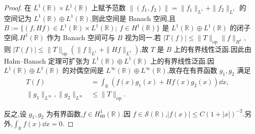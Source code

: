 \begin{proof}
在 $L^{1}(\mathbb{R}) \times L^{1}(\mathbb{R})$ 上赋予范数 $\| (f_{1}, f_{2}) \| = \| f_{1} \|_{L^{1}} + \| f_{2} \|_{L^{1}}$ 的空间记为 $L^{1}(\mathbb{R}) \oplus L^{1}(\mathbb{R})$,则此空间是 Banach 空间,且 $B := \{(f, Hf) \in L^{1}(\mathbb{R}) \times L^{1}(\mathbb{R});\ f \in H^{1}(\mathbb{R})\}$ 是 $L^{1}(\mathbb{R}) \oplus L^{1}(\mathbb{R})$ 的闭子空间.$H^{1}(\mathbb{R})$ 作为 Banach 空间可与 $B$ 视为同一.若 $|T(f)| \leq \| T \|_{\mathrm{op}}\| f \|_{H^{1}}$,则 $|T(f)| \leq \| T \|_{\mathrm{op}}\left(\| f \|_{L^{1}} + \| Hf \|_{L^{1}}\right)$,故 $T$ 是 $B$ 上的有界线性泛函.因此由 Hahn--Banach 定理可扩张为 $L^{1}(\mathbb{R}) \oplus L^{1}(\mathbb{R})$ 上的有界线性泛函.因 $L^{1}(\mathbb{R}) \oplus L^{1}(\mathbb{R})$ 的对偶空间是 $L^{\infty}(\mathbb{R}) \oplus L^{\infty}(\mathbb{R})$,故存在有界函数 $g_{1}, g_{2}$ 满足
\begin{equation*}
\begin{aligned}
T(f) &= \displaystyle\int_{\mathbb{R}}\left(f(x)g_{1}(x) + Hf(x)g_{2}(x)\right)\dd x, \\
\| g_{1} \|_{L^{\infty}}, \| g_{2} \|_{L^{\infty}} &\leq \| T \|_{\mathrm{op}}.
\end{aligned}
\end{equation*}

反之,设 $g_{1}, g_{2}$ 为有界函数,$f \in H_{00}^{1}(\mathbb{R})$.因 $f \in \mathcal{S}(\mathbb{R})$,$|f(x)| \leq C(1 + |x|)^{-2}$.另外,$\int_{\mathbb{R}}f(x)\dd x = 0$.


\end{proof}
